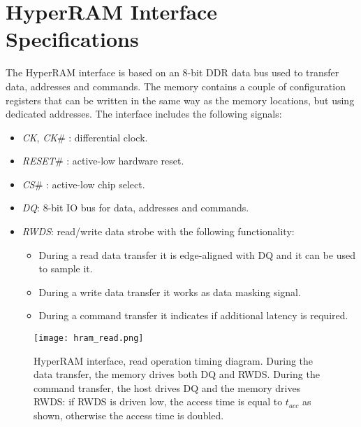 \documentclass[10pt, english, a4paper, titlepage, oneside]{book}
\begin{document}
\section{HyperRAM Interface Specifications} \label{HyperRAM Interface}
\vspace{2mm}
The HyperRAM interface is based on an 8-bit \acrshort{DDR} data bus used to transfer data, addresses and commands. The memory contains a couple of configuration registers that can be written in the same way as the memory locations, but using dedicated addresses. The interface includes the following signals:
\vspace{2mm}
\begin{itemize}
    \item \textit{CK}, \textit{CK}\# : differential clock.
    \vspace{1mm}
    \item \textit{RESET}\# : active-low hardware reset.
    \vspace{1mm}
    \item \textit{CS}\# : active-low chip select.
    \vspace{1mm}
    \item \textit{DQ}: 8-bit IO bus for data, addresses and commands.
    \vspace{1mm}
    \item \textit{RWDS}: read/write data strobe with the following functionality:
    \begin{itemize}
        \item During a read data transfer it is edge-aligned with DQ and it can be used to sample it.
        \item During a write data transfer it works as data masking signal.
        \item During a command transfer it indicates if additional latency is required.
    \end{itemize}
\end{itemize}
\vspace{6mm}
\begin{figure}[H]
    \centering
    \captionsetup{width=17cm}
    \texttt{[image: hram\_read.png]}
    \vspace{2mm}
    \caption{\centering HyperRAM interface, read operation timing diagram. During the data transfer, the memory drives both DQ and RWDS. During the command transfer, the host drives DQ and the memory drives RWDS: if RWDS is driven low, the access time is equal to $t_{acc}$ as shown, otherwise the access time is doubled.}
    \label{hram_read}
\end{figure}
\end{document}
